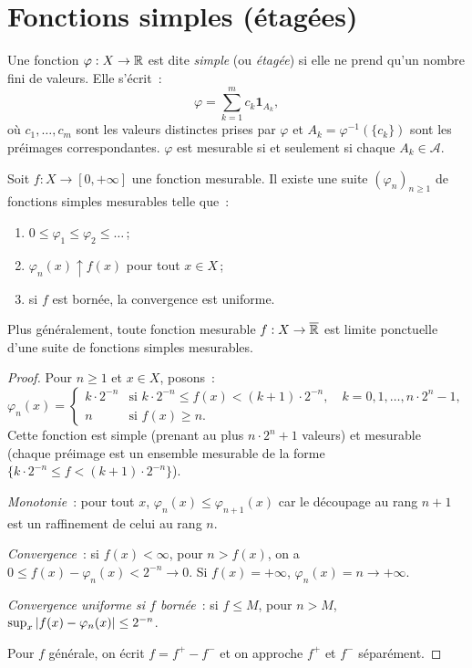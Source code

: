 \section{Fonctions simples (\'etag\'ees)}

\begin{definition}
Une fonction $\varphi : X \to \mathbb{R}$ est dite \emph{simple} (ou \emph{\'etag\'ee}) si
elle ne prend qu'un nombre fini de valeurs. Elle s'\'ecrit~:
\[
\varphi = \sum_{k=1}^m c_k \mathbf{1}_{A_k},
\]
o\`u $c_1, \ldots, c_m$ sont les valeurs distinctes prises par $\varphi$ et
$A_k = \varphi^{-1}(\{c_k\})$ sont les pr\'eimages correspondantes.
$\varphi$ est mesurable si et seulement si chaque $A_k \in \mathcal{A}$.
\end{definition}

\begin{theoreme}
\label{thm:approximation_simples}
Soit $f : X \to [0, +\infty]$ une fonction mesurable. Il existe une suite
$(\varphi_n)_{n \geq 1}$ de fonctions simples mesurables telle que~:
\begin{enumerate}
    \item $0 \leq \varphi_1 \leq \varphi_2 \leq \ldots$\,;
    \item $\varphi_n(x) \uparrow f(x)$ pour tout $x \in X$\,;
    \item si $f$ est born\'ee, la convergence est uniforme.
\end{enumerate}
Plus g\'en\'eralement, toute fonction mesurable $f : X \to \overline{\mathbb{R}}$ est limite
ponctuelle d'une suite de fonctions simples mesurables.
\end{theoreme}

\begin{proof}
Pour $n \geq 1$ et $x \in X$, posons~:
\[
\varphi_n(x) = \begin{cases}
k \cdot 2^{-n} & \text{si } k \cdot 2^{-n} \leq f(x) < (k+1) \cdot 2^{-n},
\quad k = 0, 1, \ldots, n \cdot 2^n - 1, \\
n & \text{si } f(x) \geq n.
\end{cases}
\]
Cette fonction est simple (prenant au plus $n \cdot 2^n + 1$ valeurs) et mesurable
(chaque pr\'eimage est un ensemble mesurable de la forme $\{k \cdot 2^{-n} \leq
f < (k+1) \cdot 2^{-n}\}$).

\emph{Monotonie}~: pour tout $x$, $\varphi_n(x) \leq \varphi_{n+1}(x)$ car le
d\'ecoupage au rang $n+1$ est un raffinement de celui au rang $n$.

\emph{Convergence}~: si $f(x) < \infty$, pour $n > f(x)$, on a
$0 \leq f(x) - \varphi_n(x) < 2^{-n} \to 0$. Si $f(x) = +\infty$,
$\varphi_n(x) = n \to +\infty$.

\emph{Convergence uniforme si $f$ born\'ee}~: si $f \leq M$, pour $n > M$,
$\sup_x \left| f(x) - \varphi_n(x) \right| \leq 2^{-n}$.

Pour $f$ g\'en\'erale, on \'ecrit $f = f^+ - f^-$ et on approche $f^+$ et $f^-$
s\'epar\'ement.
\end{proof}

